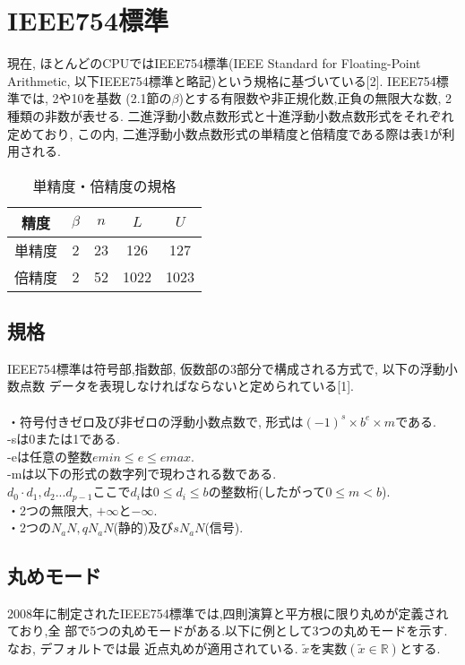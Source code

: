 \documentclass[11pt,a4paper]{jsreport}
\theoremstyle{definition}
\begin{document}
\section{IEEE754標準}
  現在, ほとんどのCPUではIEEE754標準(IEEE Standard for Floating-Point Arithmetic,
以下IEEE754標準と略記)という規格に基づいている[2]. IEEE754標準では, 2や10を基数
(2.1節の$\beta$)とする有限数や非正規化数,正負の無限大な数, 2種類の非数が表せる. 二進浮動小数点数形式と十進浮動小数点数形式をそれぞれ定めており, この内, 二進浮動小数点数形式の単精度と倍精度である際は表1が利用される. \\

\begin{table}[h]
  \centering
  \caption{単精度・倍精度の規格}
  \begin{tabular}{c|cccc}
    精度 & $\beta$ & $n$ & $L$ & $U$ \\ \hline \hline
    単精度 & 2 & 23 & 126 & 127 \\
    倍精度 & 2 & 52 & 1022 & 1023 \\ \hline
  \end{tabular}
\end{table}

\subsection{規格}
  IEEE754標準は符号部,指数部, 仮数部の3部分で構成される方式で, 以下の浮動小数点数
データを表現しなければならないと定められている[1]. \\
\\
	・符号付きゼロ及び非ゼロの浮動小数点数で, 形式は$(-1)^s \times b^e \times m$である. \\
 	-sは0または1である. \\
 	-eは任意の整数$emin \leq e \leq emax$. \\
 	-mは以下の形式の数字列で現わされる数である. \\
 	$d_0 \cdot d_1,d_2...d_{p-1}$ここで$d_i$は$0 \leq d_i \leq b$の整数桁(したがって$0 \leq m < b$). \\
	・2つの無限大, $+\infty$と$-\infty$. \\
	・2つの$N_aN,qN_aN$(静的)及び$sN_aN$(信号). \\

\subsection{丸めモード}
  2008年に制定されたIEEE754標準では,四則演算と平方根に限り丸めが定義されており,全
部で5つの丸めモードがある.以下に例として3つの丸めモードを示す. なお, デフォルトでは最
近点丸めが適用されている. $\tilde{x}$を実数$(\tilde{x} \in \mathbb{R})$とする. \\
\end{document}
